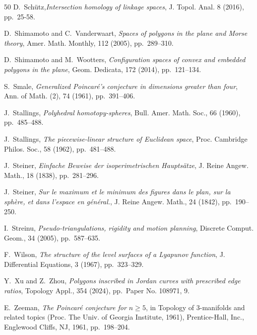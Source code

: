 \documentclass[11pt,letterpaper]{amsart}
\theoremstyle{plain}
\theoremstyle{definition}
\theoremstyle{remark}
\numberwithin{equation}{section}
\begin{document}
\begin{thebibliography}{50}
{\sc D.~Sch\"utz},{\em Intersection homology of linkage spaces},
 J. Topol. Anal. 8 (2016), pp.~25-58.


{\sc D.~Shimamoto and C.~Vanderwaart}, {\em Spaces of polygons in the plane and
  {M}orse theory}, Amer. Math. Monthly, 112 (2005), pp.~289--310.

{\sc D.~Shimamoto and M.~Wootters}, {\em Configuration spaces of convex and
  embedded polygons in the plane}, Geom. Dedicata, 172 (2014), pp.~121--134.

{\sc S.~Smale}, {\em Generalized {P}oincar\'e's conjecture in dimensions
  greater than four}, Ann. of Math. (2), 74 (1961), pp.~391--406.

{\sc J.~Stallings}, {\em Polyhedral homotopy-spheres}, Bull. Amer. Math. Soc.,
  66 (1960), pp.~485--488.

{\sc J.~Stallings}, {\em The piecewise-linear
  structure of {E}uclidean space}, Proc. Cambridge Philos. Soc., 58 (1962),
  pp.~481--488.

{\sc J.~Steiner}, {\em Einfache {B}eweise der isoperimetrischen
  {H}aupts\"atze}, J. Reine Angew. Math., 18 (1838), pp.~281--296.

{\sc J.~Steiner}, {\em Sur le maximum et le
  minimum des figures dans le plan, sur la sph{\`e}re, et dans l'espace en
  g{\'e}n{\'e}ral.}, J. Reine Angew. Math., 24 (1842), pp.~190--250.

{\sc I.~Streinu}, {\em Pseudo-triangulations, rigidity and motion planning},
  Discrete Comput. Geom., 34 (2005), pp.~587--635.

{\sc F.~Wilson}, {\em The structure of the level surfaces of a {L}yapunov
  function}, J. Differential Equations, 3 (1967), pp.~323--329.

{\sc Y.~Xu and Z.~Zhou}, {\em Polygons inscribed in {J}ordan curves with
  prescribed edge ratios}, Topology Appl., 354 (2024), pp.~Paper No. 108971, 9.

{\sc E.~Zeeman}, {\em The {P}oincar\'e{} conjecture for {$n\geq 5$}}, in
  Topology of 3-manifolds and related topics ({P}roc. {T}he {U}niv. of
  {G}eorgia {I}nstitute, 1961), Prentice-Hall, Inc., Englewood Cliffs, NJ,
  1961, pp.~198--204.

\end{thebibliography}
\end{document}
